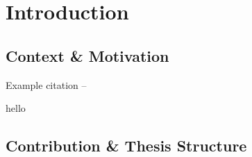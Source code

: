 \chapter{\label{intro}Introduction} 

\section{Context \& Motivation}
Example citation -- \cite{Yordanov2020}

hello

\section{Contribution \& Thesis Structure}

